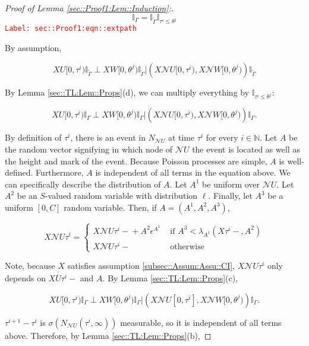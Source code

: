 \documentclass[12pt]{article}
\newcommand{\mb}{\mathbb}
\newcommand{\mc}{\mathcal}
\newcommand{\ov}{\overline}
\newcommand{\te}{\text}
\newcommand{\ep}{\epsilon}
\newcommand{\tr}{\textcolor{red}}
\newcommand{\labe}[1]{\tr{\texttt{Label: #1}}}
\renewcommand{\U}{U}							%
\newcommand{\UU}{W}								%
\renewcommand{\S}{S}							%
\newcommand{\ev}[1]{\ep^{#1}}					%
\newcommand{\X}{X}								%
\newcommand{\neigh}{\mc{N}}						%
\newcommand{\cl}{\ov}							%
\newcommand{\const}{C}							%
\newcommand{\poiss}[1]{N_{#1}}						%
\newcommand{\rt}[1]{\tau^{#1}}						%
\newcommand{\rtt}[1]{\theta^{#1}}					%
\newcommand{\itt}{i}								%
\newcommand{\ittt}{j}								%
\newcommand{\rate}[1]{\lambda_{#1}}					%
\newcommand{\Sm}{\ell}								%
\newcommand{\alt}{\widetilde}						%
\newcommand{\apath}{\Gamma}						%
\newcommand{\rv}{A}								%
\begin{document}
\begin{proof}[Proof of Lemma \ref{sec::Proof1:Lem::Induction}:]
\begin{equation}
\mb{I}_{\apath} = \mb{I}_{\alt{\apath}}\mb{I}_{\rt{\itt} \leq \rtt{\ittt}}
\label{sec::Proof1:eqn::extpath}
\end{equation}
\labe{sec::Proof1:eqn::extpath}

By assumption,

\[\X{\U}{[0,\rt{\itt})}\mb{I}_{\alt{\apath}}\perp \X{\UU}{[0,\rtt{\ittt})}\mb{I}_{\alt{\apath}}|\left(\X{\neigh{\U}}{[0,\rt{\itt})},\X{\neigh{\UU}}{[0,\rtt{\ittt})}\right)\mb{I}_{\alt{\apath}}\]

By Lemma \ref{sec::TL:Lem::Props}(d), we can multiply everything by \(\mb{I}_{\rt{\itt} \leq \rtt{\ittt}}\):

\[\X{\U}{[0,\rt{\itt})}\mb{I}_{\apath}\perp \X{\UU}{[0,\rtt{\ittt})}\mb{I}_{\apath}|\left(\X{\neigh{\U}}{[0,\rt{\itt})},\X{\neigh{\UU}}{[0,\rtt{\ittt})}\right)\mb{I}_{\apath}.\]

By definition of \(\rt{\itt}\), there is an event in \(\poiss{\neigh{\U}}\) at time \(\rt{\itt}\) for every \(\itt \in \mb{ N}\). Let \(\rv\) be the random vector signifying in which node of \(\neigh{\U}\) the event is located as well as the height and mark of the event. Because Poisson processes are simple, \(\rv\) is well-defined. Furthermore, \(\rv\) is independent of all terms in the equation above. We can specifically describe the distribution of \(\rv\). Let \(\rv^1\) be uniform over \(\neigh{\U}\). Let \(\rv^2\) be an \(\S\)-valued random variable with distribution \(\Sm\). Finally, let \(\rv^3\) be a uniform \([0,\const{}]\) random variable. Then, if \(\rv=(\rv^1,\rv^2,\rv^3)\),

\[\X{\neigh{\U}}{\rt{\itt}} = \begin{cases}
\X{\neigh{\U}}{\rt{\itt}-} + \rv^2\ev{\rv^1} &\te{ if } \rv^3< \rate{\rv^1}(\X{}{\rt{\itt}-}, \rv^2)\\
\X{\neigh{\U}}{\rt{\itt}-} &\te{ otherwise}
\end{cases}\]

Note, because \(\X{}{}\) satisfies assumption \ref{subsec::Assum:Assu::CI}, \(\X{\neigh{\U}}{\rt{\itt}}\) only depends on \(\X{\cl{\cl{\U}}}{\rt{\itt}-}\) and \(\rv\). By Lemma \ref{sec::TL:Lem::Props}(c), 

\[\X{\U}{[0,\rt{\itt})}\mb{I}_{\apath}\perp \X{\UU}{[0,\rtt{\ittt})}\mb{I}_{\apath}|\left(\X{\neigh{\U}}{[0,\rt{\itt}]},\X{\neigh{\UU}}{[0,\rtt{\ittt})}\right)\mb{I}_{\apath}.\]

\(\rt{\itt+1} - \rt{\itt}\) is \(\sigma(\poiss{\neigh{\U}}(\rt{\itt},\infty))\) measurable, so it is independent of all terms above. Therefore, by Lemma \ref{sec::TL:Lem::Props}(b),


\end{proof}
\end{document}
